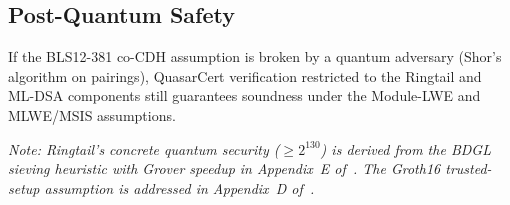 \subsection{Post-Quantum Safety}

\begin{theorem}
\label{thm:pq-safety}
If the BLS12-381 co-CDH assumption is broken by a quantum adversary
(Shor's algorithm on pairings), QuasarCert verification restricted to
the Ringtail and ML-DSA components still guarantees soundness under the
Module-LWE and MLWE/MSIS assumptions.

\medskip\noindent\textit{Note: Ringtail's concrete quantum security
($\geq 2^{130}$) is derived from the BDGL sieving heuristic with
Grover speedup in Appendix~E of~\cite{qcert-proof}.  The Groth16
trusted-setup assumption is addressed in Appendix~D
of~\cite{qcert-proof}.}
\end{theorem}

